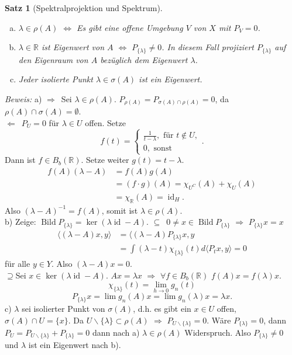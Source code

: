 \documentclass[12pt]{extreport} %
\newtheorem{Satz}{Satz}[subsection]
\DeclareMathOperator{\Bild}{Bild}
\DeclareMathOperator{\id}{id}
\numberwithin{equation}{section}
\newcommand{\R}{\mathbb{R}} %
\newcommand{\m}{\cdot}
\newcommand{\Bew}{\emph{Beweis: }}
\begin{document}
	
	
	\begin{Satz}[Spektralprojektion und Spektrum]
		~
		\begin{enumerate}[a)]
			\item $\lambda \in \rho(A)$ $\Leftrightarrow$ Es gibt eine offene Umgebung $V$ von $X$ mit $P_V = 0$.
			\item $\lambda\in \R$ ist Eigenwert von $A$ $\Leftrightarrow$ $P_{\{\lambda\}} \neq 0$. In diesem Fall projiziert $P_{\{\lambda\}}$ auf den Eigenraum von $A$ bezüglich dem Eigenwert $\lambda$.
			\item Jeder isolierte Punkt $\lambda\in \sigma(A)$ ist ein Eigenwert.
		\end{enumerate}
	\end{Satz}
	 
	 \Bew a) \glqq$\Rightarrow$\grqq\ Sei $\lambda\in \rho(A)$. $P_{\rho(A)} = P_{\sigma(A)\cap \rho(A)} = 0$, da $\rho(A)\cap \sigma(A) =\emptyset$.\\
	 \grqq$\Leftarrow$\grqq\ $P_U = 0$ für $\lambda\in U$ offen. Setze 
	 $$f(t) = \left\{\begin{array}{l}
	 \frac{1}{t-\lambda},\text{ für }t\notin U,\\
	 0,\text{ sonst}
	 \end{array} \right. .$$
	 Dann ist $f\in B_b(\R)$. Setze weiter $g(t) = t-\lambda$.
	 \begin{align*}
	 	f(A)(\lambda-A) &= f(A)g(A)\\
	 	&= (f\m g)(A) = \chi_{U^C}(A) + \chi_U(A)\\
	 	&= \chi_\R(A) = \id_H.
	 \end{align*}
	 Also $(\lambda-A)^{-1} = f(A)$, somit ist $\lambda\in \rho(A)$.\\
	 b) Zeige: $\Bild P_{\{\lambda\}} = \ker(\lambda \id-A)$. \glqq$\subseteq$\grqq\ $0\neq x\in \Bild P_{\{\lambda\}}$ $\Rightarrow$ $P_{\{\lambda\}} x= x$
	 \begin{align*}
	 	\langle (\lambda-A)x,y\rangle &= \langle (\lambda-A) P_{\{\lambda\}}x,y \\
	 	&= \int (\lambda-t)\chi_{\{\lambda\}}(t) d\langle P_t x,y\rangle = 0
	 \end{align*}
	 für alle $y\in Y$. Also $(\lambda-A)x = 0$.\\
	 \glqq$\supseteq$\grqq Sei $x\in \ker(\lambda\id-A)$. $Ax = \lambda x$ $\Rightarrow$ $\forall f\in B_b(\R)$ $f(A)x = f(\lambda)x$.
	 $$\chi_{\{\lambda\}}(t) = \lim\limits_{h\rightarrow 0} g_n(t)$$
	 $$P_{\{\lambda\}} x = \lim g_n(A)x = \lim g_n(\lambda)x = \lambda x.$$
	c) $\lambda$ sei isolierter Punkt von $\sigma(A)$, d.h. es gibt ein $x\in U$ offen, $\sigma(A)\cap U = \{x\}$. Da $U\backslash\{\lambda\} \subset \rho(A)$ $\Rightarrow$ $P_{U\backslash\{\lambda\}} = 0$. Wäre $P_{\{\lambda\}} = 0$, dann $P_U = P_{U\backslash\{\lambda\}} + P_{\{\lambda\}} = 0$ dann nach a) $\lambda\in \rho(A)$ Widerspruch. Also $P_{\{\lambda\}} \neq 0$ und $\lambda$ ist ein Eigenwert nach b). 
	
\end{document}
